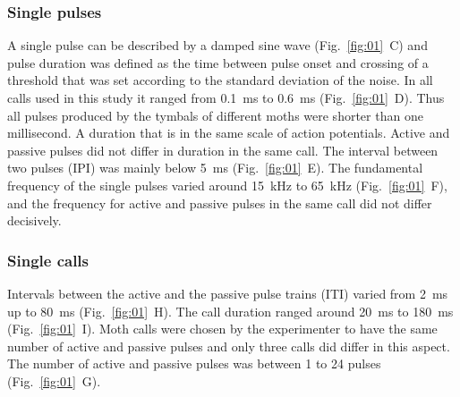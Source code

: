 \documentclass[12pt,a4paper,pdftex]{article}
\newcommand{\fig}[2]{(Fig.~#1~#2)}
\begin{document}
\subsubsection*{Single pulses}
A single pulse can be described by a damped sine wave \fig{\ref{fig:01}}{C} and pulse duration was defined as the time between pulse onset and crossing of a threshold that was set according to the standard deviation of the noise. In all calls used in this study it ranged from 0.1~ms to 0.6~ms \fig{\ref{fig:01}}{D}. Thus all pulses produced by the tymbals of different moths were shorter than one millisecond. A duration that is in the same scale of action potentials. Active and passive pulses did not differ in duration in the same call. The interval between two pulses (IPI) was mainly below 5~ms \fig{\ref{fig:01}}{E}. The fundamental frequency of the single pulses varied around 15~kHz to 65~kHz \fig{\ref{fig:01}}{F}, and the frequency for active and passive pulses in the same call did not differ decisively.

\subsubsection*{Single calls}
Intervals between the active and the passive pulse trains (ITI) varied from 2~ms up to 80~ms \fig{\ref{fig:01}}{H}. The call duration ranged around 20~ms to 180~ms \fig{\ref{fig:01}}{I}. Moth calls were chosen by the experimenter to have the same number of active and passive pulses and only three calls did differ in this aspect. The number of active and passive pulses was between 1 to 24 pulses \fig{\ref{fig:01}}{G}.
\end{document}
